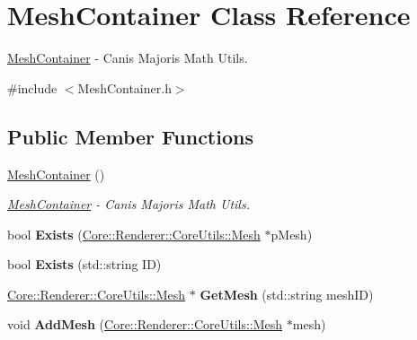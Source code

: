 \hypertarget{class_mesh_container}{\section{Mesh\+Container Class Reference}
\label{class_mesh_container}
}


\hyperlink{class_mesh_container}{Mesh\+Container} -\/ Canis Majoris Math Utils.  




{\ttfamily \#include $<$Mesh\+Container.\+h$>$}

\subsection*{Public Member Functions}
\begin{DoxyCompactItemize}
\item 
\hyperlink{class_mesh_container_a2a87edf1c94935a2f90d5e8329b56ca3}{Mesh\+Container} ()
\begin{DoxyCompactList}\small\item\em \hyperlink{class_mesh_container}{Mesh\+Container} -\/ Canis Majoris Math Utils. \end{DoxyCompactList}\item 
\hypertarget{class_mesh_container_ac19a573cc36d8f310822db7ccfd82330}{bool {\bfseries Exists} (\hyperlink{class_core_1_1_renderer_1_1_core_utils_1_1_mesh}{Core\+::\+Renderer\+::\+Core\+Utils\+::\+Mesh} $\ast$p\+Mesh)}\label{class_mesh_container_ac19a573cc36d8f310822db7ccfd82330}

\item 
\hypertarget{class_mesh_container_a1c70d4618ced6aca5fd0cb16076fe830}{bool {\bfseries Exists} (std\+::string I\+D)}\label{class_mesh_container_a1c70d4618ced6aca5fd0cb16076fe830}

\item 
\hypertarget{class_mesh_container_ae0523b57ee4aabea5e99fa8433fb7854}{\hyperlink{class_core_1_1_renderer_1_1_core_utils_1_1_mesh}{Core\+::\+Renderer\+::\+Core\+Utils\+::\+Mesh} $\ast$ {\bfseries Get\+Mesh} (std\+::string mesh\+I\+D)}\label{class_mesh_container_ae0523b57ee4aabea5e99fa8433fb7854}

\item 
\hypertarget{class_mesh_container_a1d3021635a8fa16ff275e9c2b78a713e}{void {\bfseries Add\+Mesh} (\hyperlink{class_core_1_1_renderer_1_1_core_utils_1_1_mesh}{Core\+::\+Renderer\+::\+Core\+Utils\+::\+Mesh} $\ast$mesh)}\label{class_mesh_container_a1d3021635a8fa16ff275e9c2b78a713e}


\end{DoxyCompactItemize}
